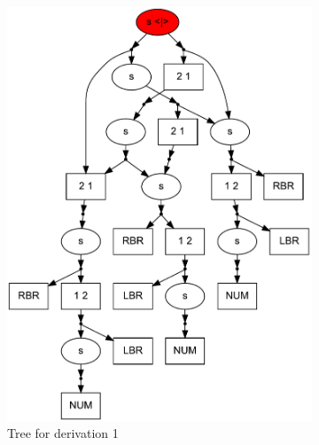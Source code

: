 \begin{figure}[ht]
\begin{center}
\begin{subfigure}[b]{0.3\textwidth}
        \includegraphics[width=\textwidth]{dot/Brackets.pdf}
        \caption{Tree for derivation 1}
        \label{tree1}        
    \end{subfigure}
    ~
    \begin{subfigure}[b]{0.3\textwidth}

\end{subfigure}
\end{center}
\end{figure}
